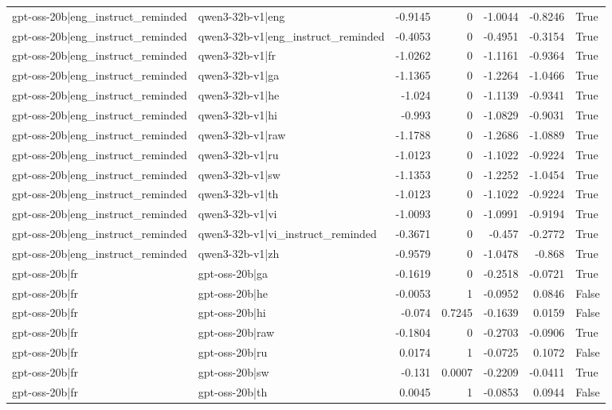 \begin{table}
\begin{tabular}{l l r r r r l}
gpt-oss-20b|eng_instruct_reminded & qwen3-32b-v1|eng & -0.9145 & 0 & -1.0044 & -0.8246 & True \\
gpt-oss-20b|eng_instruct_reminded & qwen3-32b-v1|eng_instruct_reminded & -0.4053 & 0 & -0.4951 & -0.3154 & True \\
gpt-oss-20b|eng_instruct_reminded & qwen3-32b-v1|fr & -1.0262 & 0 & -1.1161 & -0.9364 & True \\
gpt-oss-20b|eng_instruct_reminded & qwen3-32b-v1|ga & -1.1365 & 0 & -1.2264 & -1.0466 & True \\
gpt-oss-20b|eng_instruct_reminded & qwen3-32b-v1|he & -1.024 & 0 & -1.1139 & -0.9341 & True \\
gpt-oss-20b|eng_instruct_reminded & qwen3-32b-v1|hi & -0.993 & 0 & -1.0829 & -0.9031 & True \\
gpt-oss-20b|eng_instruct_reminded & qwen3-32b-v1|raw & -1.1788 & 0 & -1.2686 & -1.0889 & True \\
gpt-oss-20b|eng_instruct_reminded & qwen3-32b-v1|ru & -1.0123 & 0 & -1.1022 & -0.9224 & True \\
gpt-oss-20b|eng_instruct_reminded & qwen3-32b-v1|sw & -1.1353 & 0 & -1.2252 & -1.0454 & True \\
gpt-oss-20b|eng_instruct_reminded & qwen3-32b-v1|th & -1.0123 & 0 & -1.1022 & -0.9224 & True \\
gpt-oss-20b|eng_instruct_reminded & qwen3-32b-v1|vi & -1.0093 & 0 & -1.0991 & -0.9194 & True \\
gpt-oss-20b|eng_instruct_reminded & qwen3-32b-v1|vi_instruct_reminded & -0.3671 & 0 & -0.457 & -0.2772 & True \\
gpt-oss-20b|eng_instruct_reminded & qwen3-32b-v1|zh & -0.9579 & 0 & -1.0478 & -0.868 & True \\
gpt-oss-20b|fr & gpt-oss-20b|ga & -0.1619 & 0 & -0.2518 & -0.0721 & True \\
gpt-oss-20b|fr & gpt-oss-20b|he & -0.0053 & 1 & -0.0952 & 0.0846 & False \\
gpt-oss-20b|fr & gpt-oss-20b|hi & -0.074 & 0.7245 & -0.1639 & 0.0159 & False \\
gpt-oss-20b|fr & gpt-oss-20b|raw & -0.1804 & 0 & -0.2703 & -0.0906 & True \\
gpt-oss-20b|fr & gpt-oss-20b|ru & 0.0174 & 1 & -0.0725 & 0.1072 & False \\
gpt-oss-20b|fr & gpt-oss-20b|sw & -0.131 & 0.0007 & -0.2209 & -0.0411 & True \\
gpt-oss-20b|fr & gpt-oss-20b|th & 0.0045 & 1 & -0.0853 & 0.0944 & False \\

\end{tabular}
\end{table}
